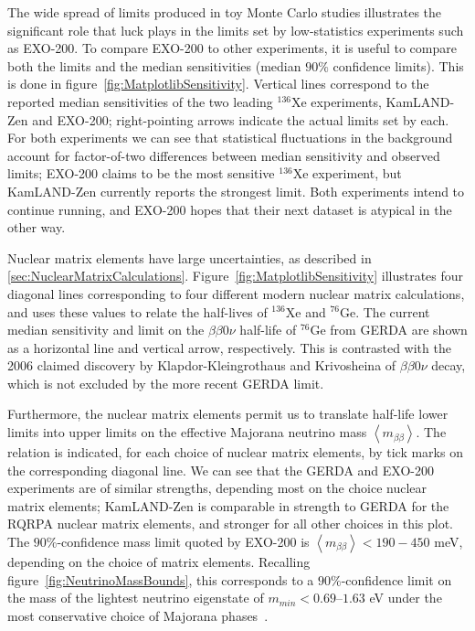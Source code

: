 The wide spread of limits produced in toy Monte Carlo studies illustrates the significant role that luck plays in the limits set by low-statistics experiments such as EXO-200.  To compare EXO-200 to other experiments, it is useful to compare both the limits and the median sensitivities (median $90\%$ confidence limits).  This is done in figure~\ref{fig:MatplotlibSensitivity}.  Vertical lines correspond to the reported median sensitivities of the two leading $^{136}$Xe experiments, KamLAND-Zen and EXO-200; right-pointing arrows indicate the actual limits set by each.  For both experiments we can see that statistical fluctuations in the background account for factor-of-two differences between median sensitivity and observed limits; EXO-200 claims to be the most sensitive $^{136}$Xe experiment, but KamLAND-Zen currently reports the strongest limit.  Both experiments intend to continue running, and EXO-200 hopes that their next dataset is atypical in the other way.

Nuclear matrix elements have large uncertainties, as described in \ref{sec:NuclearMatrixCalculations}.  Figure~\ref{fig:MatplotlibSensitivity} illustrates four diagonal lines corresponding to four different modern nuclear matrix calculations, and uses these values to relate the half-lives of $^{136}$Xe and $^{76}$Ge.  The current median sensitivity and limit on the $\beta\beta 0\nu$ half-life of $^{76}$Ge from GERDA are shown as a horizontal line and vertical arrow, respectively.  This is contrasted with the 2006 claimed discovery by Klapdor-Kleingrothaus and Krivosheina of $\beta\beta 0\nu$ decay, which is not excluded by the more recent GERDA limit.

Furthermore, the nuclear matrix elements permit us to translate half-life lower limits into upper limits on the effective Majorana neutrino mass $\left<m_{\beta\beta}\right>$.  The relation is indicated, for each choice of nuclear matrix elements, by tick marks on the corresponding diagonal line.  We can see that the GERDA and EXO-200 experiments are of similar strengths, depending most on the choice nuclear matrix elements; KamLAND-Zen is comparable in strength to GERDA for the RQRPA nuclear matrix elements, and stronger for all other choices in this plot.  The $90\%$-confidence mass limit quoted by EXO-200 is $\left<m_{\beta\beta}\right> < 190-450$ meV, depending on the choice of matrix elements.  Recalling figure~\ref{fig:NeutrinoMassBounds}, this corresponds to a $90\%$-confidence limit on the mass of the lightest neutrino eigenstate of $m_{min} < 0.69–1.63$ eV under the most conservative choice of Majorana phases~\cite{NewEXObb0nPaper_2014}.

